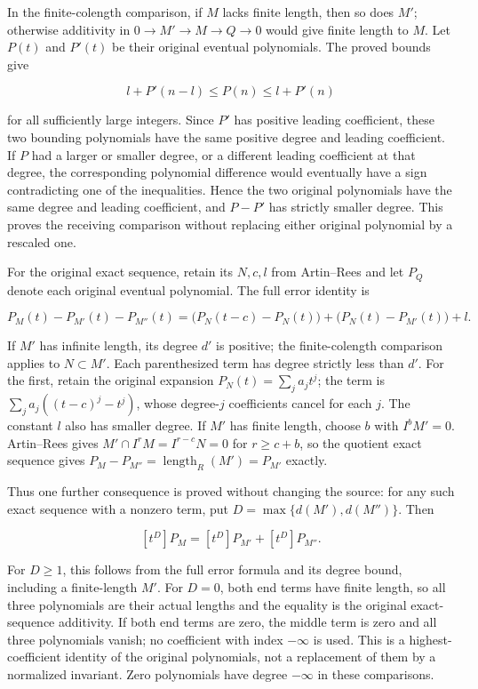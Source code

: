 In the finite-colength comparison, if \(M\) lacks finite length, then so does \(M'\); otherwise additivity in \(0\to M'\to M\to Q\to0\) would give finite length to \(M\). Let \(P(t)\) and \(P'(t)\) be their original eventual polynomials. The proved bounds give

\[
l+P'(n-l)\leq P(n)\leq l+P'(n)
\]

for all sufficiently large integers. Since \(P'\) has positive leading coefficient, these two bounding polynomials have the same positive degree and leading coefficient. If \(P\) had a larger or smaller degree, or a different leading coefficient at that degree, the corresponding polynomial difference would eventually have a sign contradicting one of the inequalities. Hence the two original polynomials have the same degree and leading coefficient, and \(P-P'\) has strictly smaller degree. This proves the receiving comparison without replacing either original polynomial by a rescaled one.

For the original exact sequence, retain its \(N,c,l\) from Artin--Rees and let \(P_Q\) denote each original eventual polynomial. The full error identity is

\[
P_M(t)-P_{M'}(t)-P_{M''}(t)
=\bigl(P_N(t-c)-P_N(t)\bigr)
 +\bigl(P_N(t)-P_{M'}(t)\bigr)+l.
\]

If \(M'\) has infinite length, its degree \(d'\) is positive; the finite-colength comparison applies to \(N\subset M'\). Each parenthesized term has degree strictly less than \(d'\). For the first, retain the original expansion \(P_N(t)=\sum_j a_jt^j\); the term is \(\sum_j a_j((t-c)^j-t^j)\), whose degree-\(j\) coefficients cancel for each \(j\). The constant \(l\) also has smaller degree. If \(M'\) has finite length, choose \(b\) with \(I^bM'=0\). Artin--Rees gives \(M'\cap I^rM=I^{r-c}N=0\) for \(r\geq c+b\), so the quotient exact sequence gives \(P_M-P_{M''}=\operatorname{length}_R(M')=P_{M'}\) exactly.

Thus one further consequence is proved without changing the source: for any such exact sequence with a nonzero term, put \(D=\max\{d(M'),d(M'')\}\). Then

\[
[t^D]P_M=[t^D]P_{M'}+[t^D]P_{M''}.
\]

For \(D\geq1\), this follows from the full error formula and its degree bound, including a finite-length \(M'\). For \(D=0\), both end terms have finite length, so all three polynomials are their actual lengths and the equality is the original exact-sequence additivity. If both end terms are zero, the middle term is zero and all three polynomials vanish; no coefficient with index \(-\infty\) is used. This is a highest-coefficient identity of the original polynomials, not a replacement of them by a normalized invariant. Zero polynomials have degree \(-\infty\) in these comparisons.

